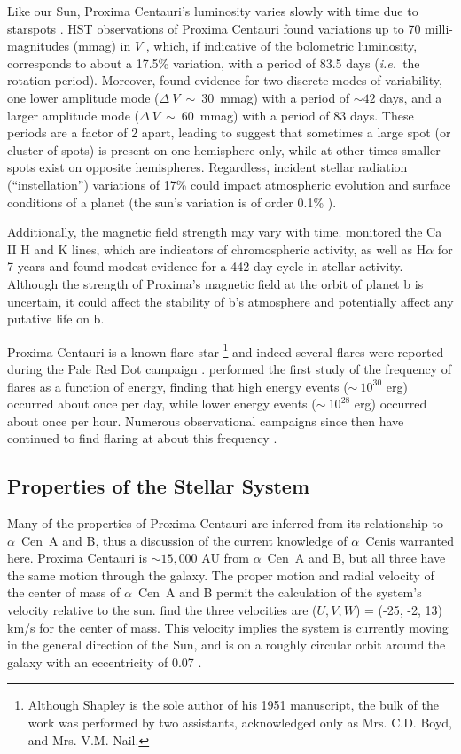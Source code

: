 \documentclass[preprint,12pt]{aastex}
\def\ie{{\it i.e.\ }}
\def\acen{{$\alpha$~Cen}}
\begin{document}
Like our Sun, Proxima Centauri's luminosity varies slowly with time
due to starspots \citep{Benedict93}. HST observations of Proxima
Centauri found variations up to 70 milli-magnitudes (mmag) in $V$
\citep{Benedict98}, which, if indicative of the bolometric luminosity,
corresponds to about a 17.5\% variation, with a
period of 83.5 days (\ie the rotation period). Moreover,
\cite{Benedict98} found evidence for two discrete modes of
variability, one lower amplitude mode ($\Delta~V~\sim~30$~mmag) with a
period of $\sim 42$ days, and a larger amplitude mode
($\Delta~V~\sim~60$~mmag) with a period of 83 days. These periods are
a factor of 2 apart, leading \cite{Benedict98} to suggest that
sometimes a large spot (or cluster of spots) is present on one
hemisphere only, while at other times smaller spots exist on opposite
hemispheres. Regardless, incident stellar radiation (``instellation'')
variations of 17\% could impact atmospheric evolution and surface
conditions of a planet (the sun's variation is of order 0.1\%
\citep{Willson81}).

Additionally, the magnetic field strength may vary with
time. \cite{Cincunegui07} monitored the Ca II H and K lines, which are
indicators of chromospheric activity, as well as H$\alpha$ for 7 years
and found modest evidence for a 442 day cycle in stellar
activity. Although the strength of Proxima's magnetic field at the
orbit of planet b is uncertain, it could affect the stability of
b's atmosphere and potentially affect any putative life on b. 

Proxima Centauri is a known flare star
\citep{Shapley51}\footnote{Although Shapley is the sole author of his
  1951 manuscript, the bulk of the work was performed by two 
  assistants, acknowledged only as Mrs. C.D. Boyd, and Mrs. V.M. Nail.}  and indeed several flares
were reported during the Pale Red Dot campaign
\citep{AngladaEscude16}. \cite{Walker81} performed the first study of
the frequency of flares as a function of energy, finding that high
energy events ($\sim~10^{30}$ erg) occurred about once per day, while
lower energy events ($\sim~10^{28}$ erg) occurred about once per
hour. Numerous observational campaigns since then have continued to
find flaring at about this frequency
\citep{Benedict98,AngladaEscude16,Davenport16}.

\subsection{Properties of the Stellar System}
\label{sec:obs:stellarsys}
Many of the properties of Proxima Centauri are inferred from its 
relationship to \acen~A and B, thus a discussion of the current 
knowledge of \acen is warranted here. 
Proxima Centauri is $\sim 15,000$ AU from \acen~A and B, but all three
have the same motion through the galaxy. The proper motion and radial
velocity of the center of mass of \acen~A and B permit the calculation
of the system's velocity relative to the sun. \cite{Poveda96} find the
three velocities are ($U, V, W$) = (-25, -2, 13) km/s for the center
of mass. This velocity implies the system is currently moving in the
general direction of the Sun, and is on a roughly circular orbit around the galaxy with an
eccentricity of 0.07 \citep{AllenHerrera98}.
\end{document}
